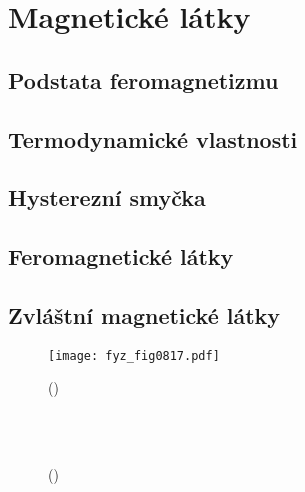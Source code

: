 \setchaptertoc
\chapter{Magnetické látky}\label{fyz:IIchapXXXVII}

  \section{Podstata feromagnetizmu}\label{fyz:IIchapXXXVIIsecI}
  \section{Termodynamické vlastnosti}\label{fyz:IIchapXXXVIIsecII}
  \section{Hysterezní smyčka}\label{fyz:IIchapXXXVIIsecIII}
  \section{Feromagnetické látky}\label{fyz:IIchapXXXVIIsecIV}
  \section{Zvláštní magnetické látky}\label{fyz:IIchapXXXVIIsecV}

    \begin{figure}[ht!] %
      \centering
      \texttt{[image: fyz\_fig0817.pdf]}
      \caption{
               (\cite[s.~707]{Feynman02})}
      \label{fyz:fig0817}
    \end{figure}

    \begin{figure}[ht!]
      \centering
                     \\
                     \\
      \caption{
               (\cite[s.~748]{Feynman02})}
      \label{fyz:fig0818}
    \end{figure}

